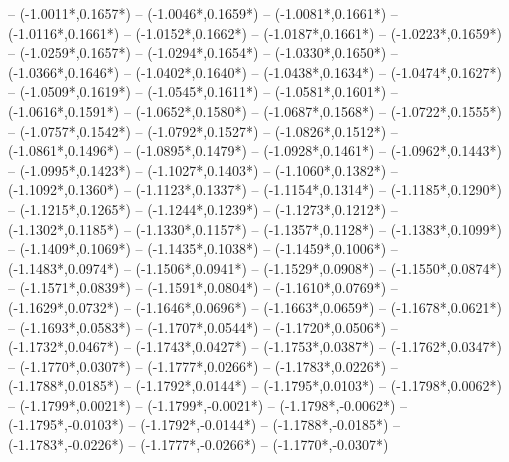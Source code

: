 {	-- ({-1.0011*\dx},{0.1657*\dy})
	-- ({-1.0046*\dx},{0.1659*\dy})
	-- ({-1.0081*\dx},{0.1661*\dy})
	-- ({-1.0116*\dx},{0.1661*\dy})
	-- ({-1.0152*\dx},{0.1662*\dy})
	-- ({-1.0187*\dx},{0.1661*\dy})
	-- ({-1.0223*\dx},{0.1659*\dy})
	-- ({-1.0259*\dx},{0.1657*\dy})
	-- ({-1.0294*\dx},{0.1654*\dy})
	-- ({-1.0330*\dx},{0.1650*\dy})
	-- ({-1.0366*\dx},{0.1646*\dy})
	-- ({-1.0402*\dx},{0.1640*\dy})
	-- ({-1.0438*\dx},{0.1634*\dy})
	-- ({-1.0474*\dx},{0.1627*\dy})
	-- ({-1.0509*\dx},{0.1619*\dy})
	-- ({-1.0545*\dx},{0.1611*\dy})
	-- ({-1.0581*\dx},{0.1601*\dy})
	-- ({-1.0616*\dx},{0.1591*\dy})
	-- ({-1.0652*\dx},{0.1580*\dy})
	-- ({-1.0687*\dx},{0.1568*\dy})
	-- ({-1.0722*\dx},{0.1555*\dy})
	-- ({-1.0757*\dx},{0.1542*\dy})
	-- ({-1.0792*\dx},{0.1527*\dy})
	-- ({-1.0826*\dx},{0.1512*\dy})
	-- ({-1.0861*\dx},{0.1496*\dy})
	-- ({-1.0895*\dx},{0.1479*\dy})
	-- ({-1.0928*\dx},{0.1461*\dy})
	-- ({-1.0962*\dx},{0.1443*\dy})
	-- ({-1.0995*\dx},{0.1423*\dy})
	-- ({-1.1027*\dx},{0.1403*\dy})
	-- ({-1.1060*\dx},{0.1382*\dy})
	-- ({-1.1092*\dx},{0.1360*\dy})
	-- ({-1.1123*\dx},{0.1337*\dy})
	-- ({-1.1154*\dx},{0.1314*\dy})
	-- ({-1.1185*\dx},{0.1290*\dy})
	-- ({-1.1215*\dx},{0.1265*\dy})
	-- ({-1.1244*\dx},{0.1239*\dy})
	-- ({-1.1273*\dx},{0.1212*\dy})
	-- ({-1.1302*\dx},{0.1185*\dy})
	-- ({-1.1330*\dx},{0.1157*\dy})
	-- ({-1.1357*\dx},{0.1128*\dy})
	-- ({-1.1383*\dx},{0.1099*\dy})
	-- ({-1.1409*\dx},{0.1069*\dy})
	-- ({-1.1435*\dx},{0.1038*\dy})
	-- ({-1.1459*\dx},{0.1006*\dy})
	-- ({-1.1483*\dx},{0.0974*\dy})
	-- ({-1.1506*\dx},{0.0941*\dy})
	-- ({-1.1529*\dx},{0.0908*\dy})
	-- ({-1.1550*\dx},{0.0874*\dy})
	-- ({-1.1571*\dx},{0.0839*\dy})
	-- ({-1.1591*\dx},{0.0804*\dy})
	-- ({-1.1610*\dx},{0.0769*\dy})
	-- ({-1.1629*\dx},{0.0732*\dy})
	-- ({-1.1646*\dx},{0.0696*\dy})
	-- ({-1.1663*\dx},{0.0659*\dy})
	-- ({-1.1678*\dx},{0.0621*\dy})
	-- ({-1.1693*\dx},{0.0583*\dy})
	-- ({-1.1707*\dx},{0.0544*\dy})
	-- ({-1.1720*\dx},{0.0506*\dy})
	-- ({-1.1732*\dx},{0.0467*\dy})
	-- ({-1.1743*\dx},{0.0427*\dy})
	-- ({-1.1753*\dx},{0.0387*\dy})
	-- ({-1.1762*\dx},{0.0347*\dy})
	-- ({-1.1770*\dx},{0.0307*\dy})
	-- ({-1.1777*\dx},{0.0266*\dy})
	-- ({-1.1783*\dx},{0.0226*\dy})
	-- ({-1.1788*\dx},{0.0185*\dy})
	-- ({-1.1792*\dx},{0.0144*\dy})
	-- ({-1.1795*\dx},{0.0103*\dy})
	-- ({-1.1798*\dx},{0.0062*\dy})
	-- ({-1.1799*\dx},{0.0021*\dy})
	-- ({-1.1799*\dx},{-0.0021*\dy})
	-- ({-1.1798*\dx},{-0.0062*\dy})
	-- ({-1.1795*\dx},{-0.0103*\dy})
	-- ({-1.1792*\dx},{-0.0144*\dy})
	-- ({-1.1788*\dx},{-0.0185*\dy})
	-- ({-1.1783*\dx},{-0.0226*\dy})
	-- ({-1.1777*\dx},{-0.0266*\dy})
	-- ({-1.1770*\dx},{-0.0307*\dy})
}
